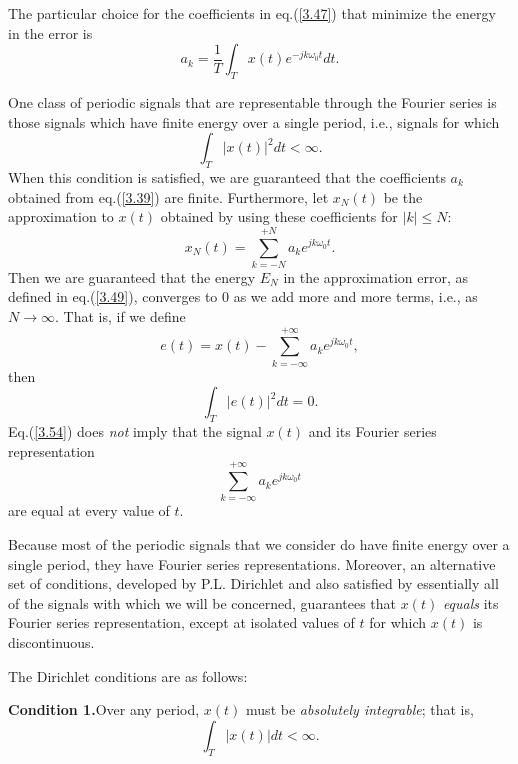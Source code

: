 \documentclass[a4paper,10pt,twoside]{book}
\begin{document}
The particular choice for the coefficients in eq.\;(\ref{3.47}) that minimize the energy in the error is
\begin{equation}
    a_k = \frac1T\int_Tx(t)e^{-jk\omega_0t} dt.
    \label{3.50}
\end{equation}

One class of periodic signals that are representable through the Fourier series is those signals which have finite energy over a single period, i.e., signals for which
\begin{equation}
    \int_T|x(t)|^2dt<\infty.
    \label{3.51}
\end{equation}
When this condition is satisfied, we are guaranteed that the coefficients $a_k$ obtained from eq.\;(\ref{3.39}) are finite. Furthermore, let $x_N(t)$ be the approximation to $x(t)$ obtained by using these coefficients for $|k|\le N$:
\begin{equation}
    x_N(t)=\sum_{k=-N}^{+N}a_ke^{jk\omega_0t}.
    \label{3.52}
\end{equation}
Then we are guaranteed that the energy $E_N$ in the approximation error, as defined in eq.\;(\ref{3.49}), converges to 0 as we add more and more terms, i.e., as $N\to\infty$. That is, if we define
\begin{equation}
    e(t) = x(t)-\sum_{k=-\infty}^{+\infty}a_ke^{jk\omega_0t},
    \label{3.53}
\end{equation}
then
\begin{equation}
    \int_T|e(t)|^2dt=0.
    \label{3.54}
\end{equation}
Eq.\;(\ref{3.54}) does \textit{not} imply that the signal $x(t)$ and its Fourier series representation
\begin{equation}
    \sum_{k=-\infty}^{+\infty}a_ke^{jk\omega_0t}
    \label{3.55}
\end{equation}
are equal at every value of $t$.

Because most of the periodic signals that we consider do have finite energy over a single period, they have Fourier series representations. Moreover, an alternative set of conditions, developed by P.L. Dirichlet and also satisfied by essentially all of the signals with which we will be concerned, guarantees that $x(t)$ \textit{equals} its Fourier series representation, except at isolated values of $t$ for which $x(t)$ is discontinuous.

The Dirichlet conditions are as follows:

\noindent\textbf{Condition 1.}\quad Over any period, $x(t)$ must be \textit{absolutely integrable}; that is,
\begin{equation}
    \int_T|x(t)|dt<\infty.
    \label{3.56}
\end{equation}
\end{document}
